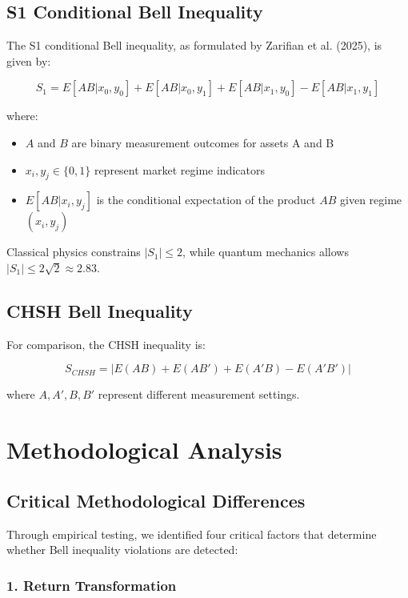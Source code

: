 \documentclass[11pt,a4paper]{article}
\begin{document}
\subsection{S1 Conditional Bell Inequality}

The S1 conditional Bell inequality, as formulated by Zarifian et al. (2025), is given by:

\begin{equation}
S_1 = E[AB|x_0,y_0] + E[AB|x_0,y_1] + E[AB|x_1,y_0] - E[AB|x_1,y_1]
\end{equation}

where:
\begin{itemize}
    \item $A$ and $B$ are binary measurement outcomes for assets A and B
    \item $x_i, y_j \in \{0,1\}$ represent market regime indicators
    \item $E[AB|x_i,y_j]$ is the conditional expectation of the product $AB$ given regime $(x_i,y_j)$
\end{itemize}

Classical physics constrains $|S_1| \leq 2$, while quantum mechanics allows $|S_1| \leq 2\sqrt{2} \approx 2.83$.

\subsection{CHSH Bell Inequality}

For comparison, the CHSH inequality is:

\begin{equation}
S_{CHSH} = |E(AB) + E(AB') + E(A'B) - E(A'B')|
\end{equation}

where $A, A', B, B'$ represent different measurement settings.

\section{Methodological Analysis}

\subsection{Critical Methodological Differences}

Through empirical testing, we identified four critical factors that determine whether Bell inequality violations are detected:

\subsubsection{1. Return Transformation}
\end{document}
